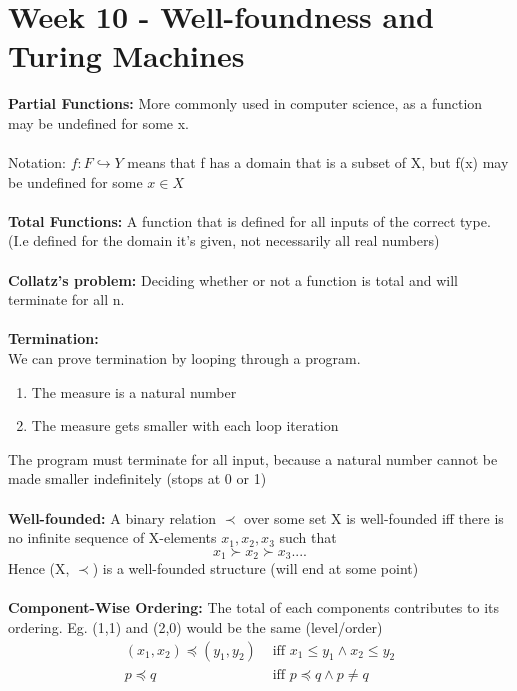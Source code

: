 \documentclass[a4paper,10pt]{article}
\begin{document}
\section*{Week 10 - Well-foundness and Turing Machines}
\textcolor{JungleGreen}{\textbf{Partial Functions:}} More commonly used in computer science, as a function may be undefined for some x. \\\\
Notation: $ f:F \hookrightarrow Y$ means that f has a domain that is a subset of X, but f(x) may be undefined for some $x \in X$\\\\
\textcolor{JungleGreen}{\textbf{Total Functions:}} A function that is defined for all inputs of the correct type. (I.e defined for the domain it's given, not necessarily all real numbers)\\\\
\textcolor{JungleGreen}{\textbf{Collatz's problem:}} Deciding whether or not a function is total and will terminate for all n. \\\\
\textcolor{JungleGreen}{\textbf{Termination:}} \\
We can prove termination by looping through a program. 
\begin{enumerate}
\item The measure is a natural number 
\item The measure gets smaller with each loop iteration
\end{enumerate}
The program must terminate for all input, because a natural number cannot be made smaller indefinitely (stops at 0 or 1) \\\\
\textcolor{JungleGreen}{\textbf{Well-founded:}} A binary relation $\prec$ over some set X is well-founded iff there is no infinite sequence of X-elements $x_{1}, x_{2}, x_{3}$ such that
\begin{equation*}
 x_{1} \succ x_{2} \succ x_{3}....
\end{equation*}
Hence (X, $\prec$) is a well-founded structure (will end at some point) \\\\
\textcolor{JungleGreen}{\textbf{Component-Wise Ordering:}} The total of each components contributes to its ordering. Eg. (1,1) and (2,0) would be the same (level/order)\\
\begin{align*}
(x_{1}, x_{2}) \preceq (y_{1}, y_{2}) &\textrm{ iff } x_{1} \leq y_{1} \land x_{2} \leq y_{2} \\
p \preceq q &\textrm{ iff } p \preceq q \land p \neq q
\end{align*}
\end{document}
